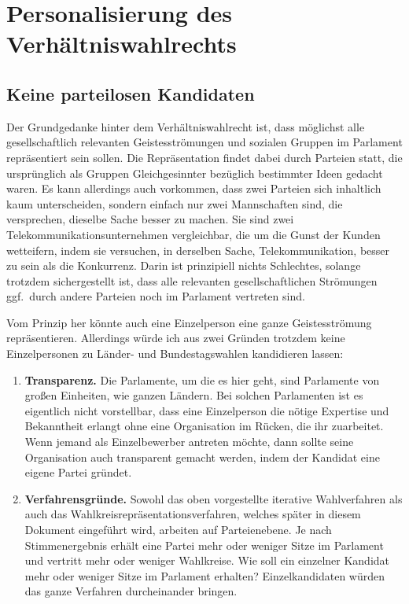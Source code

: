 \section{Personalisierung des Verhältniswahlrechts}

\subsection{Keine parteilosen Kandidaten}

Der Grundgedanke hinter dem Verhältniswahlrecht ist, dass möglichst alle gesellschaftlich
relevanten Geistesströmungen und sozialen Gruppen im Parlament repräsentiert sein sollen. Die
Repräsentation findet dabei durch Parteien statt, die ursprünglich als Gruppen Gleichgesinnter
bezüglich bestimmter Ideen gedacht waren. Es kann allerdings auch vorkommen, dass zwei Parteien
sich inhaltlich kaum unterscheiden, sondern einfach nur zwei Mannschaften sind, die versprechen,
dieselbe Sache besser zu machen. Sie sind zwei Telekommunikationsunternehmen vergleichbar, die
um die Gunst der Kunden wetteifern, indem sie versuchen, in derselben Sache, Telekommunikation,
besser zu sein als die Konkurrenz. Darin ist prinzipiell nichts Schlechtes, solange trotzdem
sichergestellt ist, dass alle relevanten gesellschaftlichen Strömungen ggf.\ durch andere Parteien
noch im Parlament vertreten sind.

Vom Prinzip her könnte auch eine Einzelperson eine ganze Geistesströmung repräsentieren.
Allerdings würde ich aus zwei Gründen trotzdem keine Einzelpersonen zu Länder- und
Bundestagswahlen kandidieren lassen:
\begin{enumerate}
  \item \textbf{Transparenz.} Die Parlamente, um die es hier geht, sind Parlamente von großen
    Einheiten, wie ganzen Ländern. Bei solchen Parlamenten ist es eigentlich nicht vorstellbar,
    dass eine Einzelperson die nötige Expertise und Bekanntheit erlangt ohne eine Organisation
    im Rücken, die ihr zuarbeitet. Wenn jemand als Einzelbewerber antreten möchte, dann sollte
    seine Organisation auch transparent gemacht werden, indem der Kandidat eine eigene Partei
    gründet.

  \item \textbf{Verfahrensgründe.} Sowohl das oben vorgestellte iterative Wahlverfahren als auch
    das Wahlkreisrepräsentationsverfahren, welches später in diesem Dokument eingeführt wird,
    arbeiten auf Parteienebene. Je nach Stimmenergebnis erhält eine Partei mehr oder weniger
    Sitze im Parlament und vertritt mehr oder weniger Wahlkreise. Wie soll ein einzelner Kandidat
    mehr oder weniger Sitze im Parlament erhalten? Einzelkandidaten würden das ganze Verfahren
    durcheinander bringen.
\end{enumerate}

